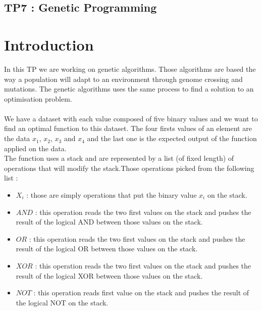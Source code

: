 \documentclass[14pt]
{article}
\begin{document}
\pagestyle{fancy}

\bigskip
\begin{center}
	\section*{\textbf{{\LARGE TP7 : Genetic Programming}}}
\end{center}
\bigskip\bigskip\bigskip

\section{Introduction}
In this TP we are working on genetic algorithms. Those algorithms are based the way a population will adapt to an environment through genome crossing and mutations. The genetic algorithms uses the same process to find a solution to an optimisation problem.\\
\\
We have a dataset with each value composed of five binary values and we want to find an optimal function to this dataset. The four firsts values of an element are the data $x_{1}$, $x_{2}$, $x_{3}$ and $x_{4}$ and the last one is the expected output of the function applied on the data.\\
The function uses a stack and are represented by a list (of fixed length) of operations that will modify the stack.Those operations picked from the following list :\\
\begin{itemize}

\item[] $X_{i}$ : those are simply operations that put the binary value $x_{i}$ on the stack.\\
\item[] $AND$ : this operation reads the two first values on the stack and pushes the result of the logical AND between those values on the stack.\\
\item[] $OR$ : this operation reads the two first values on the stack and pushes the result of the logical OR between those values on the stack.\\
\item[] $XOR$ : this operation reads the two first values on the stack and pushes the result of the logical XOR between those values on the stack.\\
\item[] $NOT$ : this operation reads first value on the stack and pushes the result of the logical NOT on the stack.\\
\end{itemize}
\end{document}
